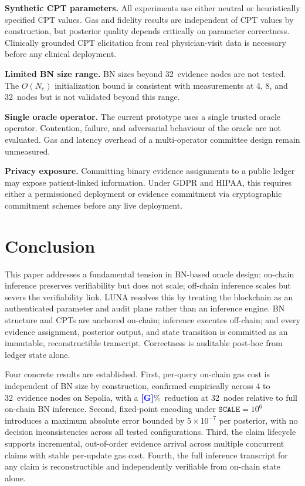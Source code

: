 \documentclass[journal]{IEEEtran}
\newcommand{\placeholder}[1]{\textcolor{blue}{\textbf{[#1]}}}
\begin{document}
\textbf{Synthetic CPT parameters.}
All experiments use either neutral or heuristically
specified CPT values. Gas and fidelity results are
independent of CPT values by construction, but
posterior quality depends critically on parameter
correctness. Clinically grounded CPT elicitation from
real physician-visit data is necessary before any
clinical deployment.

\textbf{Limited BN size range.}
BN sizes beyond 32~evidence nodes are not tested. The
$O(N_e)$ initialization bound is consistent with
measurements at 4, 8, and 32~nodes but is not
validated beyond this range.

\textbf{Single oracle operator.}
The current prototype uses a single trusted oracle
operator. Contention, failure, and adversarial
behaviour of the oracle are not evaluated. Gas and
latency overhead of a multi-operator committee design
remain unmeasured.

\textbf{Privacy exposure.}
Committing binary evidence assignments to a public
ledger may expose patient-linked information. Under
GDPR and HIPAA, this requires either a permissioned
deployment or evidence commitment via cryptographic
commitment schemes before any live deployment.


\section{Conclusion}
\label{sec:conclusion}

This paper addresses a fundamental tension in
BN-based oracle design: on-chain inference preserves
verifiability but does not scale; off-chain inference
scales but severs the verifiability link.
LUNA resolves this by treating the blockchain as an
authenticated parameter and audit plane rather than
an inference engine. BN structure and CPTs are
anchored on-chain; inference executes off-chain; and
every evidence assignment, posterior output, and state
transition is committed as an immutable,
reconstructible transcript. Correctness is auditable
post-hoc from ledger state alone.

Four concrete results are established. First, per-query
on-chain gas cost is independent of BN size by
construction, confirmed empirically across 4 to
32~evidence nodes on Sepolia, with a
\placeholder{G}\%~reduction at 32~nodes relative to
full on-chain BN inference. Second, fixed-point
encoding under $\texttt{SCALE}=10^6$ introduces a
maximum absolute error bounded by $5\times10^{-7}$
per posterior, with no decision inconsistencies across
all tested configurations. Third, the claim lifecycle
supports incremental, out-of-order evidence arrival
across multiple concurrent claims with stable
per-update gas cost. Fourth, the full inference
transcript for any claim is reconstructible and
independently verifiable from on-chain state alone.
\end{document}
